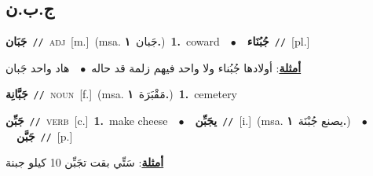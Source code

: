 \documentclass[10pt,a4paper,twoside]{article} %
\begin{document}
\begin{multicols}{2}
{{\vspace{-3mm}
\subsection*{\color{blue}\foreignlanguage{arabic}{ج.ب.ن}\color{blue}{}} 

{\setlength\topsep{0pt}\textbf{\foreignlanguage{arabic}{جَبَان}}\ {\color{gray}\texttt{//}\color{black}}\ \textsc{adj}\ [m.]\ \color{gray}(msa. \foreignlanguage{arabic}{جَبان}~\foreignlanguage{arabic}{\textbf{١.}})\color{black}\ \textbf{1.}~coward\ \ $\bullet$\ \ \setlength\topsep{0pt}\textbf{\foreignlanguage{arabic}{جُبُنَاء}}\ {\color{gray}\texttt{//}\color{black}}\ [pl.]\  \begin{flushright}\color{gray}\foreignlanguage{arabic}{\textbf{\underline{\foreignlanguage{arabic}{أمثلة}}}: أولادها جُبُناء ولا واحد فيهم زلمة قد حاله\ $\bullet$\ \  هاد واحد جَبان}\end{flushright}\color{black}} \vspace{2mm}

{\setlength\topsep{0pt}\textbf{\foreignlanguage{arabic}{جَبَّانِة}}\ {\color{gray}\texttt{//}\color{black}}\ \textsc{noun}\ [f.]\ \color{gray}(msa. \foreignlanguage{arabic}{مَقْبَرَة}~\foreignlanguage{arabic}{\textbf{١.}})\color{black}\ \textbf{1.}~cemetery\ 

{\setlength\topsep{0pt}\textbf{\foreignlanguage{arabic}{جَبِّن}}\ {\color{gray}\texttt{//}\color{black}}\ \textsc{verb}\ [c.]\ \textbf{1.}~make cheese\ \ $\bullet$\ \ \setlength\topsep{0pt}\textbf{\foreignlanguage{arabic}{يجَبِّن}}\ {\color{gray}\texttt{//}\color{black}}\ [i.]\ \color{gray}(msa. \foreignlanguage{arabic}{يصنع جُبْنَة}~\foreignlanguage{arabic}{\textbf{١.}})\color{black}\ \ $\bullet$\ \ \setlength\topsep{0pt}\textbf{\foreignlanguage{arabic}{جَبَّن}}\ {\color{gray}\texttt{//}\color{black}}\ [p.]\  \begin{flushright}\color{gray}\foreignlanguage{arabic}{\textbf{\underline{\foreignlanguage{arabic}{أمثلة}}}: سَتِّي بقت تجَبِّن 10 كيلو جبنة}\end{flushright}\color{black}} \vspace{2mm}

}}}
\end{multicols}
\end{document}
